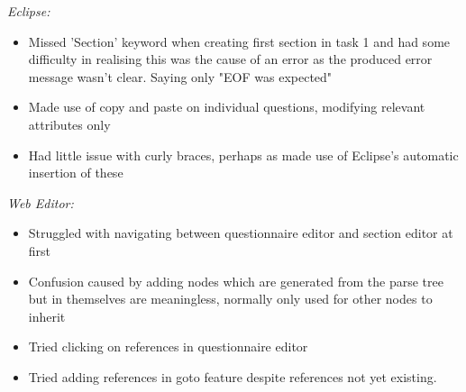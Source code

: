 \documentclass{report}
\begin{document}
\emph{Eclipse:}
\begin{itemize}
\item Missed 'Section' keyword when creating first section in task 1 and had some difficulty in realising this was the cause of an error as the produced error message wasn't clear. Saying only "EOF was expected"
\item Made use of copy and paste on individual questions, modifying relevant attributes only
\item Had little issue with curly braces, perhaps as made use of Eclipse's automatic insertion of these
\end{itemize}
\emph{Web Editor:}
\begin{itemize}
\item Struggled with navigating between questionnaire editor and section editor at first
\item Confusion caused by adding nodes which are generated from the parse tree but in themselves are meaningless, normally only used for other nodes to inherit
\item Tried clicking on references in questionnaire editor
\item Tried adding references in goto feature despite references not yet existing.
\end{itemize}
\end{document}
